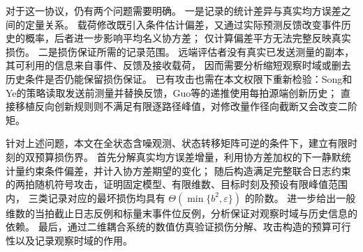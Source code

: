 对于这一协议，仍有两个问题需要明确。
一是记录的统计差异与真实均方误差之间的定量关系。
载荷修改既引入条件估计偏差，又通过实际预测反馈改变事件历史的概率，后者进一步影响平均名义协方差；
仅计算偏差平方无法完整反映真实损伤。
二是损伤保证所需的记录范围。
远端评估者没有真实已发送测量的副本，其可利用的信息来自事件、反馈及接收载荷，
因而需要分析缩短观察时域或删去历史条件是否仍能保留损伤保证。
已有攻击也需在本文权限下重新检验：Song和Ye的策略读取发送前测量并替换反馈，Guo等的递推使用每拍源端创新历史；
直接移植反向创新规则\cite{shang2022}则不满足有限逐路径峰值，对修改量作径向截断又会改变二阶矩。

针对上述问题，本文在全状态含噪观测、状态转移矩阵可逆的条件下，建立有限时刻的双预算损伤界。
首先分解真实均方误差增量，利用协方差加权的下一静默统计量约束条件偏差，并计入协方差期望的变化；
随后构造满足完整联合日志约束的两拍随机符号攻击，证明固定模型、有限维数、目标时刻及预设有限峰值范围内，
三类记录对应的最坏损伤均具有 $\Theta(\min\{b^2,\varepsilon\})$ 的阶数。
进一步给出一般维数的当拍截止日志反例和标量末事件位反例，分析保证对观察时域与历史信息的依赖。
最后，通过二维耦合系统的数值仿真验证损伤分解、攻击构造的预算可行性以及记录观察时域的作用。
